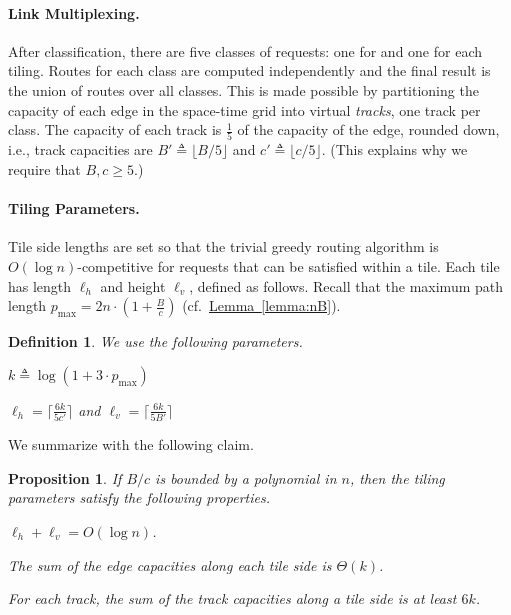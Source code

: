 \documentclass[11pt]{article}
\newtheorem{proposition}[theorem]{Proposition}
\newcommand{\namedref}[2]{\hyperref[#2]{#1~\ref*{#2}}}
\newcommand{\lemmaref}[1]{\namedref{Lemma}{#1}}
\newtheorem{defn}[theorem]{Definition}
\newcommand{\pmax}{p_{\max}}
\newenvironment{proof sketch}[1]{\noindent {\emph{Proof sketch of #1:}}}{\hfill \qed}
\newcommand{\near}{\text{\emph{Near}}\xspace}
\newcommand{\Hl}{\ell_h}
\newcommand{\vl}{\ell_v}
\begin{document}
\paragraph{Link Multiplexing\ifnum{}.\fi}
After classification, there are five classes of
requests: one for \near and one for each tiling. Routes for each class
are computed independently and the final result is the union of routes
over all classes. This is made possible by partitioning the capacity
of each edge in the space-time
grid into virtual \emph{tracks}, one track per class.  The capacity of each
track is $\frac15$ of the capacity of the edge, rounded
down, i.e., track capacities are $B'\triangleq \lfloor B/5
\rfloor$ and
{$c'\triangleq \lfloor c/5 \rfloor$}.  (This explains why
we require that $B,c\geq 5$.)

\paragraph{Tiling Parameters\ifnum{}.\fi}
Tile side lengths are set so that the trivial greedy routing algorithm
is $O(\log n)$-competitive for requests that can be satisfied within a
tile. Each tile
has length $\Hl$ and height $\vl$, defined as follows.
Recall that the maximum path length $\pmax= 2n  \cdot (1+\frac{B}{c})$ (cf.~\lemmaref{lemma:nB}).
\begin{defn}\label{def:xy}
We use the following parameters.
\begin{compactitem}
\item $k\triangleq\log(1+ 3\cdot \pmax)$
\item $\Hl=  \lceil\frac{6k}{5c'}\rceil$ and $\vl=\lceil\frac{6k}{5B'}\rceil$
\end{compactitem}
\end{defn}
\noindent
We summarize with the following claim.


\begin{proposition}\label{prop:tiling}
If $B/c$ is bounded by a polynomial in $n$, then the tiling parameters
satisfy the following properties.
  \begin{compactenum}
  \item $\Hl+\vl = O(\log n)$.
  \item The sum of the edge capacities along each tile side is $\Theta(k)$.
  \item For each track, the sum of the track capacities along a tile side is at least $6k$.
\end{compactenum}
\end{proposition}
\end{document}
